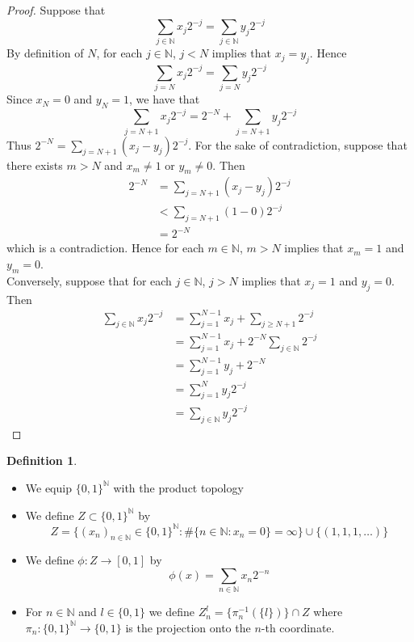 \documentclass{book}
\theoremstyle{definition}
\newtheorem{defn}[definition]{Definition}
\newcommand{\N}{\mathbb{N}}
\newcommand{\lex}[1]{\label{ex:#1}}
\DeclareMathOperator*{\0}{\mbf{0}}
\DeclareMathOperator*{\1}{\mbf{1}}
\begin{document}
	\begin{proof}
		Suppose that 
		$$\sum\limits_{j \in \N} x_j 2^{-j} = \sum\limits_{j \in \N} y_j 2^{-j}$$
		By definition of $N$, for each $j \in \N$, $j < N$ implies that $x_j = y_j$. Hence 
		$$\sum\limits_{j = N} x_j 2^{-j} = \sum\limits_{j = N} y_j 2^{-j}$$ 
		Since $x_N = 0$ and $y_N = 1$, we have that 
		$$\sum\limits_{j = N +1} x_j 2^{-j} = 2^{-N} + \sum\limits_{j = N+1} y_j 2^{-j}$$ 
		Thus $2^{-N} = \sum\limits_{j = N+1} (x_j - y_j) 2^{-j}$. For the sake of contradiction, suppose that there exists $m > N$ and $x_m \neq 1$ or $y_m \neq 0$. Then
		\begin{align*}
			2^{-N} 
			&= \sum\limits_{j = N+1} (x_j - y_j) 2^{-j} \\
			& < \sum\limits_{j = N+1} (1 - 0) 2^{-j} \\
			& = 2^{-N}
		\end{align*}
		which is a contradiction. Hence for each $m \in \N$, $m > N$ implies that $x_m = 1$ and $y_m = 0$. \vspace{.2cm}\\
		Conversely, suppose that for each $j \in \N$, $j > N$ implies that $x_j = 1$ and $y_j = 0$. Then 
		\begin{align*}
			\sum\limits_{j \in \N} x_j 2^{-j}
			& = \sum_{j=1}^{N-1} x_j + \sum_{j \geq N+1} 2^{-j} \\
			& = \sum_{j=1}^{N-1} x_j + 2^{-N} \sum_{j \in \N} 2^{-j} \\
			& = \sum_{j=1}^{N-1} y_j + 2^{-N} \\
			& = \sum_{j=1}^N y_j2^{-j} \\
			& = \sum\limits_{j \in \N} y_j 2^{-j}
		\end{align*}
	\end{proof}

	\begin{defn} \lex{28003} \
		\begin{itemize}
			\item We equip $\{0,1\}^{\N}$ with the product topology 
			\item We define $Z \subset \{0,1\}^{\N}$ by 
			$$Z = \bigg \{(x_n)_{n \in \N} \in \{0,1\}^{\N}: \# \{n \in \N: x_n = 0\} = \infty  \bigg \} \cup \{(1, 1, 1, \ldots)\}$$ 
			\item We define $\phi: Z \rightarrow [0,1]$ by 
			$$\phi(x) = \sum\limits_{n \in \N} x_n2^{-n}$$
			\item For $n \in \N$ and $l \in \{0,1\}$ we define $Z_n^l = \{\pi_n^{-1}(\{l\})\} \cap Z$ where $\pi_n: \{0,1 \}^{\N} \rightarrow \{0,1\}$ is the projection onto the $n$-th coordinate.
		\end{itemize}
	\end{defn}
\end{document}
